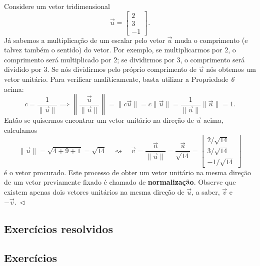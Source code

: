 \begin{ex}
	Considere um vetor tridimensional
	\begin{equation}
	\vec{u} =
	\begin{bmatrix}
	2 \\ 3 \\ -1
	\end{bmatrix}.
	\end{equation} Já sabemos a multiplicação de um escalar pelo vetor $\vec{u}$ muda o comprimento (e talvez também o sentido) do vetor. Por exemplo, se multiplicarmos por $2$, o comprimento será multiplicado por $2$; se dividirmos por $3$, o comprimento será dividido por $3$. Se nós dividirmos pelo próprio comprimento de $\vec{u}$ nós obtemos um vetor unitário. Para verificar analíticamente, basta utilizar a Propriedade \textit{6} acima:
	\begin{equation}
	c = \frac{1}{\|\vec{u}\|} \implies \left\| \frac{\vec{u}}{\|\vec{u}\|} \right\| = \|c \vec{u} \| = c \|\vec{u}\| = \frac{1}{\|\vec{u}\|}\|\vec{u}\| = 1.
	\end{equation} Então se quisermos encontrar um vetor unitário na direção de $\vec{u}$ acima, calculamos
	\begin{equation}
	\|\vec{u}\| = \sqrt{4 + 9 + 1} = \sqrt{14} \quad \rightsquigarrow \quad \vec{v} = \frac{\vec{u}}{\|\vec{u}\|} = \frac{\vec{u}}{\sqrt{14}} =
	\begin{bmatrix}
	2/\sqrt{14} \\ 3/\sqrt{14} \\ -1/\sqrt{14}
	\end{bmatrix}
	\end{equation} é o vetor procurado. Este processo de obter um vetor unitário na mesma direção de um vetor previamente fixado é chamado de \textbf{normalização}. Observe que existem apenas dois vetores unitários na mesma direção de $\vec{u}$, a saber, $\vec{v}$ e $- \vec{v}. \ \lhd$
\end{ex}

\subsection*{Exercícios resolvidos}

\construirExeresol

\subsection*{Exercícios}

\construirExer

